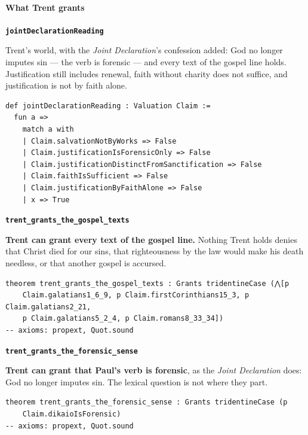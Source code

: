 \documentclass[11pt]{article}
\begin{document}
\paragraph*{What Trent grants}
\leavevmode\par
\par\medskip\noindent\textbf{\texttt{joint\allowbreak{}Declaration\allowbreak{}Reading}}\par\nobreak\noindent
Trent's world, with the \emph{Joint Declaration}'s confession added: God no longer imputes sin — the verb is forensic — and every text of the gospel line holds. Justification still includes renewal, faith without charity does not suffice, and justification is not by faith alone.

{\small\begin{verbatim}
def jointDeclarationReading : Valuation Claim :=
  fun a =>
    match a with
    | Claim.salvationNotByWorks => False
    | Claim.justificationIsForensicOnly => False
    | Claim.justificationDistinctFromSanctification => False
    | Claim.faithIsSufficient => False
    | Claim.justificationByFaithAlone => False
    | x => True
\end{verbatim}}
\par\medskip\noindent\textbf{\texttt{trent\_\allowbreak{}grants\_\allowbreak{}the\_\allowbreak{}gospel\_\allowbreak{}texts}}\par\nobreak\noindent
\textbf{Trent can grant every text of the gospel line.} Nothing Trent holds denies that Christ died for our sins, that righteousness by the law would make his death needless, or that another gospel is accursed.

{\small\begin{verbatim}
theorem trent_grants_the_gospel_texts : Grants tridentineCase (⋀[p
    Claim.galatians1_6_9, p Claim.firstCorinthians15_3, p Claim.galatians2_21,
    p Claim.galatians5_2_4, p Claim.romans8_33_34])
-- axioms: propext, Quot.sound
\end{verbatim}}
\par\medskip\noindent\textbf{\texttt{trent\_\allowbreak{}grants\_\allowbreak{}the\_\allowbreak{}forensic\_\allowbreak{}sense}}\par\nobreak\noindent
\textbf{Trent can grant that Paul's verb is forensic}, as the \emph{Joint Declaration} does: God no longer imputes sin. The lexical question is not where they part.

{\small\begin{verbatim}
theorem trent_grants_the_forensic_sense : Grants tridentineCase (p
    Claim.dikaioIsForensic)
-- axioms: propext, Quot.sound
\end{verbatim}}
\end{document}
